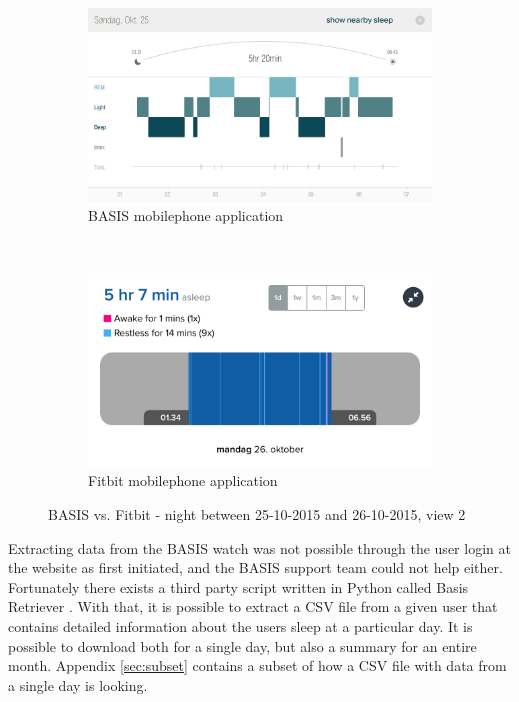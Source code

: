 \documentclass[12pt]{article} %
\begin{document}
\begin{figure}[H]
    \centering
    \begin{subfigure}[b]{0.45\textwidth}
        \includegraphics[width=\textwidth]{26-10-basis1}
        \caption{BASIS mobilephone application}
        \label{fig:basis2}
    \end{subfigure}
    ~ %
    \begin{subfigure}[b]{0.45\textwidth}
        \includegraphics[width=\textwidth]{26-10-fitbit1}
        \caption{Fitbit mobilephone application}
        \label{fig:fitbit2}
    \end{subfigure}
    \caption{BASIS vs. Fitbit - night between 25-10-2015 and 26-10-2015, view 2}
    \label{fig:pilot2}
\end{figure}

Extracting data from the BASIS watch was not possible through the user login at the website as first initiated, and the BASIS support team could not help either. Fortunately there exists a third party script written in Python called Basis Retriever \cite{basis_retriever}. With that, it is possible to extract a CSV file from a given user that contains detailed information about the users sleep at a particular day. It is possible to download both for a single day, but also a summary for an entire month. Appendix \ref{sec:subset} contains a subset of how a CSV file with data from a single day is looking. \\
\end{document}

